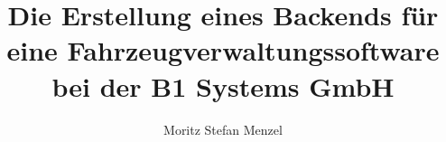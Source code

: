 \documentclass[a4paper,
	11pt,
	]{scrartcl}
\newcommand{\beins}{B1 Systems GmbH}
\begin{document}



\parindent0pt
\parskip11pt

\begin{titlepage}
\titlehead{
\centering
\texttt{[image: b1-systems.eps]}
}
\title{Die Erstellung eines Backends für eine Fahrzeugverwaltungssoftware bei der \beins{}}
\author{Moritz Stefan Menzel}
\publishers{\beins}
\subject{Prüflingsnummer: xxxxxx}
\maketitle\thispagestyle{empty}
\end{titlepage}

\end{document}

